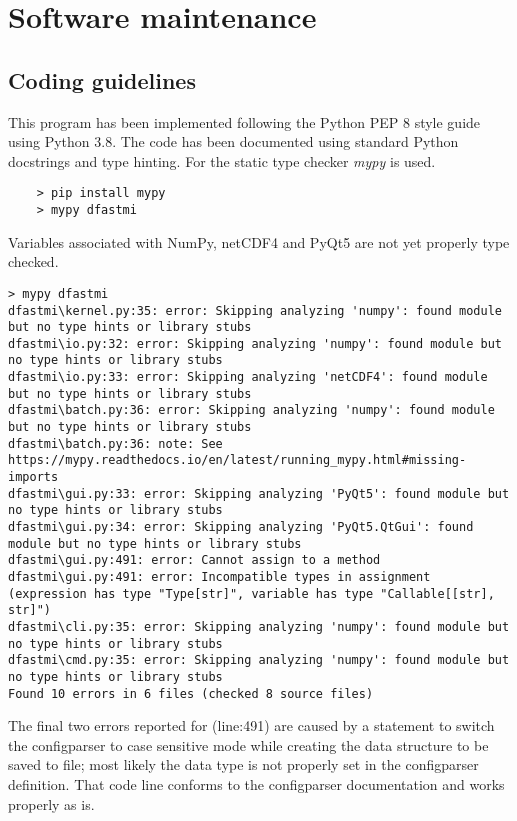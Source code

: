 \chapter{Software maintenance}

\section{Coding guidelines}

This program has been implemented following the Python PEP 8 style guide using Python 3.8.
The code has been documented using standard Python docstrings and type hinting.
For the static type checker \emph{mypy} is used.

\begin{Verbatim}
    > pip install mypy
    > mypy dfastmi
\end{Verbatim}

Variables associated with NumPy, netCDF4 and PyQt5 are not yet properly type checked.

\begin{Verbatim}[fontsize=\tiny]
> mypy dfastmi
dfastmi\kernel.py:35: error: Skipping analyzing 'numpy': found module but no type hints or library stubs
dfastmi\io.py:32: error: Skipping analyzing 'numpy': found module but no type hints or library stubs
dfastmi\io.py:33: error: Skipping analyzing 'netCDF4': found module but no type hints or library stubs
dfastmi\batch.py:36: error: Skipping analyzing 'numpy': found module but no type hints or library stubs
dfastmi\batch.py:36: note: See https://mypy.readthedocs.io/en/latest/running_mypy.html#missing-imports
dfastmi\gui.py:33: error: Skipping analyzing 'PyQt5': found module but no type hints or library stubs
dfastmi\gui.py:34: error: Skipping analyzing 'PyQt5.QtGui': found module but no type hints or library stubs
dfastmi\gui.py:491: error: Cannot assign to a method
dfastmi\gui.py:491: error: Incompatible types in assignment (expression has type "Type[str]", variable has type "Callable[[str], str]")
dfastmi\cli.py:35: error: Skipping analyzing 'numpy': found module but no type hints or library stubs
dfastmi\cmd.py:35: error: Skipping analyzing 'numpy': found module but no type hints or library stubs
Found 10 errors in 6 files (checked 8 source files)
\end{Verbatim}

The final two errors reported for  (line:491) are caused by a statement to switch the configparser to case sensitive mode while creating the data structure to be saved to file; most likely the data type is not properly set in the configparser definition.
That code line conforms to the configparser documentation and works properly as is.

